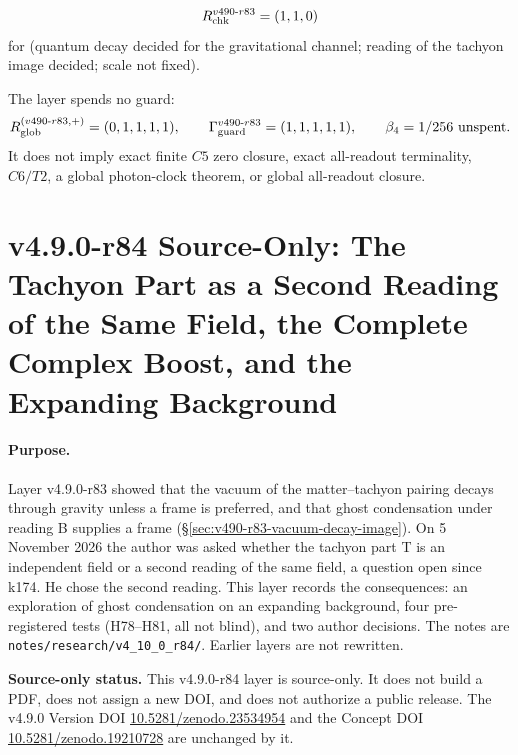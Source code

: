 \[
R_{\rm chk}^{v490\text{-}r83}=(1,1,0)
\]
for (quantum decay decided for the gravitational channel; reading of the tachyon image decided; scale not fixed).

The layer spends no guard:
\[
R_{\rm glob}^{(v490\text{-}r83,+)}=(0,1,1,1,1),
\qquad
\Gamma_{\rm guard}^{v490\text{-}r83}=(1,1,1,1,1),
\qquad
\beta_4=1/256\ \text{unspent}.
\]
It does not imply exact finite \(C5\) zero closure, exact all-readout terminality,
\(C6/T2\), a global photon-clock theorem, or global all-readout closure.


\clearpage
\section*{v4.9.0-r84 Source-Only: The Tachyon Part as a Second Reading of the Same Field, the Complete Complex Boost, and the Expanding Background}
\label{sec:v490-r84-second-reading}

\paragraph{Purpose.}
Layer v4.9.0-r83 showed that the vacuum of the matter--tachyon pairing decays through gravity unless a frame is preferred, and that
ghost condensation under reading B supplies a frame (\S\ref{sec:v490-r83-vacuum-decay-image}).  On 5 November 2026 the author was
asked whether the tachyon part T is an independent field or a second reading of the same field, a question open since k174.  He chose
the second reading.  This layer records the consequences: an exploration of ghost condensation on an expanding background, four
pre-registered tests (H78--H81, all not blind), and two author decisions.  The notes are
\texttt{notes/\allowbreak research/\allowbreak v4\_10\_0\_r84/}.  Earlier layers are not rewritten.

\noindent\textbf{Source-only status.}
This v4.9.0-r84 layer is source-only.  It does not build a PDF, does not assign a new DOI,
and does not authorize a public release.  The v4.9.0 Version DOI
\href{https://doi.org/10.5281/zenodo.23534954}{10.5281/zenodo.23534954} and the Concept DOI
\href{https://doi.org/10.5281/zenodo.19210728}{10.5281/zenodo.19210728} are unchanged by it.

